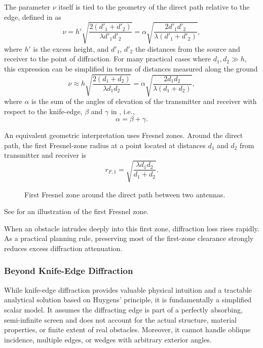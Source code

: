 The parameter $\nu$ itself is tied to the geometry of the direct path relative to the edge, defined in  as
\begin{equation}
  \nu = h' \sqrt{\frac{2(d'_1 + d'_2)}{\lambda d'_1 d'_2}} = \alpha \sqrt{\frac{2 d'_1 d'_2}{\lambda(d'_1 + d'_2)}},
\end{equation}
where $h'$ is the excess height, and $d'_1$, $d'_2$ the distances from the source and receiver to the point of diffraction. For many practical cases where $d_1, d_2 \gg h$, this expression can be simplified in terms of distances measured along the ground
\begin{equation}
  \nu \approx h \sqrt{\frac{2(d_1 + d_2)}{\lambda d_1 d_2}} = \alpha \sqrt{\frac{2 d_1 d_2}{\lambda(d_1 + d_2)}},
\end{equation}
where $\alpha$ is the sum of the angles of elevation of the transmitter and receiver with respect to the knife-edge, $\beta$ and $\gamma$ in , i.e.,
\begin{equation}
  \alpha = \beta + \gamma.
\end{equation}

An equivalent geometric interpretation uses Fresnel zones. Around the direct path, the first Fresnel-zone radius at a point located at distances $d_1$ and $d_2$ from transmitter and receiver is
\begin{equation}
  r_{F,1}=\sqrt{\frac{\lambda d_1 d_2}{d_1+d_2}}.
\end{equation}

\begin{figure}
  \centering
  \caption{First Fresnel zone around the direct path between two antennas.}
\end{figure}

See  for an illustration of the first Fresnel zone.

When an obstacle intrudes deeply into this first zone, diffraction loss rises rapidly. As a practical planning rule, preserving most of the first-zone clearance strongly reduces excess diffraction attenuation.

\subsubsection{Beyond Knife-Edge Diffraction}

While knife-edge diffraction provides valuable physical intuition and a tractable analytical solution based on Huygens' principle, it is fundamentally a simplified scalar model. It assumes the diffracting edge is part of a perfectly absorbing, semi-infinite screen and does not account for the actual structure, material properties, or finite extent of real obstacles. Moreover, it cannot handle oblique incidence, multiple edges, or wedges with arbitrary exterior angles.

